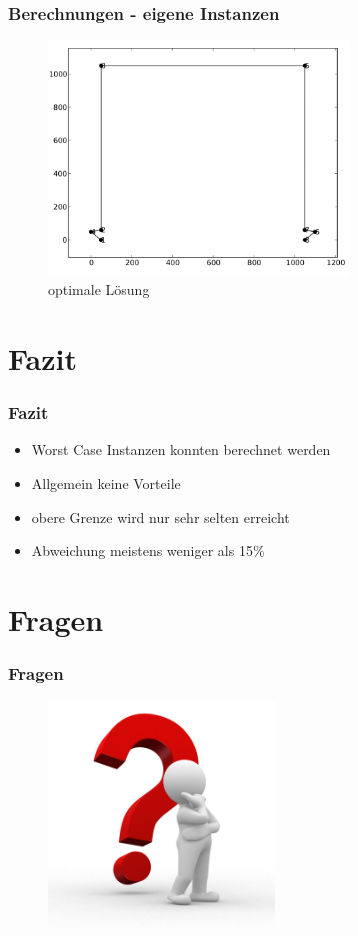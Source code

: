 \documentclass[12pt]{beamer}
\begin{document}
    \begin{frame}
        \frametitle{Berechnungen - eigene Instanzen}
        \begin{figure}[H]
            \centering
            \includegraphics[width=8cm]{gfx/hoogeveen_hpp_optimal}
            \caption{optimale Lösung}
        \end{figure}
    \end{frame}

    \section{Fazit}
    \begin{frame}
        \frametitle{Fazit}
	    \begin{itemize}
                \item Worst Case Instanzen konnten berechnet werden
                \item Allgemein keine Vorteile
                \item obere Grenze wird nur sehr selten erreicht
                \item Abweichung meistens weniger als 15\%
            \end{itemize}
    \end{frame}

    \section{Fragen}
    \begin{frame}
    \frametitle{Fragen}
        \begin{figure}[H]
	    \centering
	        \includegraphics[width=6cm]{gfx/questionmark}
        \end{figure}
    \end{frame}
\end{document}
